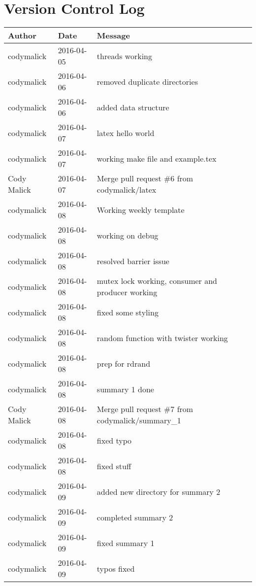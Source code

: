 \documentclass[10pt,letterpaper]{article}
\begin{document}
\section{Version Control Log}

\begin{center}
\begin{longtabu} to \textwidth {|
    X[4,l]|
    X[3,c]|
    X[8,l]|}
    \hline
    \textbf{Author} & \textbf{Date} & \textbf{Message} \\ \hline
codymalick & 2016-04-05 & threads working \\ \hline
codymalick & 2016-04-06 & removed duplicate directories \\ \hline
codymalick & 2016-04-06 & added data structure \\ \hline
codymalick & 2016-04-07 & latex hello world \\ \hline
codymalick & 2016-04-07 & working make file and example.tex \\ \hline
Cody Malick & 2016-04-07 & Merge pull request \#6 from codymalick/latex \\ \hline
codymalick & 2016-04-08 & Working weekly template \\ \hline
codymalick & 2016-04-08 & working on debug \\ \hline
codymalick & 2016-04-08 & resolved barrier issue \\ \hline
codymalick & 2016-04-08 & mutex lock working, consumer and producer working \\ \hline
codymalick & 2016-04-08 & fixed some styling \\ \hline
codymalick & 2016-04-08 & random function with twister working \\ \hline
codymalick & 2016-04-08 & prep for rdrand \\ \hline
codymalick & 2016-04-08 & summary 1 done \\ \hline
Cody Malick & 2016-04-08 & Merge pull request \#7 from codymalick/summary\_1 \\ \hline
codymalick & 2016-04-08 & fixed typo \\ \hline
codymalick & 2016-04-08 & fixed stuff \\ \hline
codymalick & 2016-04-09 & added new directory for summary 2 \\ \hline
codymalick & 2016-04-09 & completed summary 2 \\ \hline
codymalick & 2016-04-09 & fixed summary 1 \\ \hline
codymalick & 2016-04-09 & typos fixed \\ \hline

\end{longtabu}
\end{center}
\end{document}
